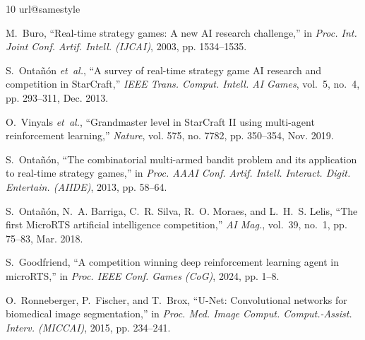 \documentclass[conference]{IEEEtran}
\begin{document}
\begin{thebibliography}{10}
\providecommand{\url}[1]{#1}
\csname url@samestyle\endcsname
\providecommand{\newblock}{\relax}
\providecommand{\bibinfo}[2]{#2}
\providecommand{\BIBentrySTDinterwordspacing}{\spaceskip=0pt\relax}
\providecommand{\BIBentryALTinterwordstretchfactor}{4}
\providecommand{\BIBentryALTinterwordspacing}{\spaceskip=\fontdimen2\font plus
\BIBentryALTinterwordstretchfactor\fontdimen3\font minus
  \fontdimen4\font\relax}
\providecommand{\BIBforeignlanguage}[2]{{%
\expandafter\ifx\csname l@#1\endcsname\relax
\typeout{** WARNING: IEEEtran.bst: No hyphenation pattern has been}%
\typeout{** loaded for the language `#1'. Using the pattern for}%
\typeout{** the default language instead.}%
\else
\language=\csname l@#1\endcsname
\fi
#2}}
\providecommand{\BIBdecl}{\relax}
\BIBdecl
\renewcommand{\BIBentryALTinterwordstretchfactor}{4}

M.~Buro, ``Real-time strategy games: A new {AI} research challenge,'' in
  \emph{Proc. Int. Joint Conf. Artif. Intell. ({IJCAI})}, 2003, pp. 1534--1535.

S.~Onta{\~n}{\'o}n \emph{et~al.}, ``A survey of real-time strategy game {AI}
  research and competition in {StarCraft},'' \emph{{IEEE} Trans. Comput.
  Intell. {AI} Games}, vol.~5, no.~4, pp. 293--311, Dec. 2013.

O.~Vinyals \emph{et~al.}, ``Grandmaster level in {StarCraft II} using
  multi-agent reinforcement learning,'' \emph{Nature}, vol. 575, no. 7782, pp.
  350--354, Nov. 2019.

S.~Onta{\~n}{\'o}n, ``The combinatorial multi-armed bandit problem and its
  application to real-time strategy games,'' in \emph{Proc. {AAAI} Conf. Artif.
  Intell. Interact. Digit. Entertain. ({AIIDE})}, 2013, pp. 58--64.

S.~Onta{\~n}{\'o}n, N.~A. Barriga, C.~R. Silva, R.~O. Moraes, and L.~H.~S.
  Lelis, ``The first {MicroRTS} artificial intelligence competition,''
  \emph{{AI} Mag.}, vol.~39, no.~1, pp. 75--83, Mar. 2018.

S.~Goodfriend, ``A competition winning deep reinforcement learning agent in
  {microRTS},'' in \emph{Proc. {IEEE} Conf. Games ({CoG})}, 2024, pp. 1--8.

O.~Ronneberger, P.~Fischer, and T.~Brox, ``{U-Net}: Convolutional networks for
  biomedical image segmentation,'' in \emph{Proc. Med. Image Comput.
  Comput.-Assist. Interv. ({MICCAI})}, 2015, pp. 234--241.


\end{thebibliography}
\end{document}
